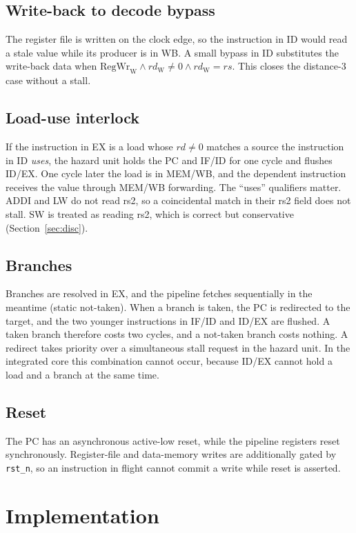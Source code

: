 \documentclass[conference]{IEEEtran}
\newcommand{\code}[1]{\texttt{\small #1}}
\begin{document}
\subsection{Write-back to decode bypass}
The register file is written on the clock edge, so the instruction in ID would read a stale value while its producer is in WB. A small bypass in ID substitutes the write-back data when $\text{RegWr}_{\text{W}} \wedge rd_{\text{W}} \neq 0 \wedge rd_{\text{W}} = rs$. This closes the distance-3 case without a stall.

\subsection{Load-use interlock}
If the instruction in EX is a load whose $rd \neq 0$ matches a source the instruction in ID \emph{uses}, the hazard unit holds the PC and IF/ID for one cycle and flushes ID/EX. One cycle later the load is in MEM/WB, and the dependent instruction receives the value through MEM/WB forwarding. The ``uses'' qualifiers matter. ADDI and LW do not read rs2, so a coincidental match in their rs2 field does not stall. SW is treated as reading rs2, which is correct but conservative (Section~\ref{sec:disc}).

\subsection{Branches}
Branches are resolved in EX, and the pipeline fetches sequentially in the meantime (static not-taken). When a branch is taken, the PC is redirected to the target, and the two younger instructions in IF/ID and ID/EX are flushed. A taken branch therefore costs two cycles, and a not-taken branch costs nothing. A redirect takes priority over a simultaneous stall request in the hazard unit. In the integrated core this combination cannot occur, because ID/EX cannot hold a load and a branch at the same time.

\subsection{Reset}
The PC has an asynchronous active-low reset, while the pipeline registers reset synchronously. Register-file and data-memory writes are additionally gated by \code{rst\_n}, so an instruction in flight cannot commit a write while reset is asserted.

\section{Implementation}
\label{sec:impl}
\end{document}
